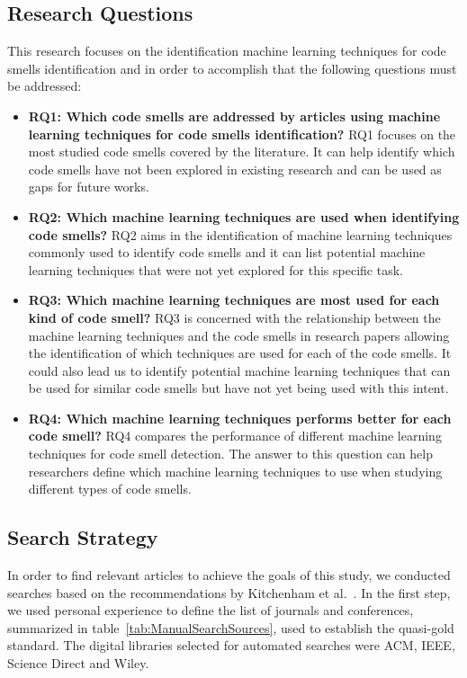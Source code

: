 \subsection{Research Questions}

 This research focuses on the identification machine learning techniques for code smells identification and in order to accomplish that the following questions must be addressed: 

\begin{itemize}
    \item \textbf{RQ1: Which code smells are addressed by articles using machine learning techniques for code smells identification?}
    RQ1 focuses on the most studied code smells covered by the literature. It can help identify which code smells have not been explored in existing research and can be used as gaps for future works.
    \item \textbf{RQ2: Which machine learning techniques are used when identifying code smells?} 
    RQ2 aims in the identification of machine learning techniques  commonly used to identify code smells and it can list potential machine learning techniques that were not yet explored for this specific task.
    \item \textbf{RQ3: Which machine learning techniques are most used for each kind of code smell?}
    RQ3 is concerned with the relationship between the machine learning techniques and the code smells in research papers allowing the identification of which techniques are used for each of the code smells. It could also lead us to identify potential machine learning techniques that can be used for similar code smells but have not yet being used with this intent.
    \item \textbf{RQ4: Which machine learning techniques performs better for each code smell?}
    RQ4 compares the performance of different machine learning techniques for code smell detection. The answer to this question can help researchers define which machine learning techniques to use when studying different types of code smells.
\end{itemize}

\subsection{Search Strategy}

In order to find relevant articles to achieve the goals of this study, we conducted searches based on the recommendations by Kitchenham et al.~\cite{kitchenham2015evidence}. In the first step, we used personal experience to define the list of journals and conferences, summarized in table~\ref{tab:ManualSearchSources}, used to establish the quasi-gold standard. The digital libraries selected for automated searches were ACM, IEEE, Science Direct and Wiley.


